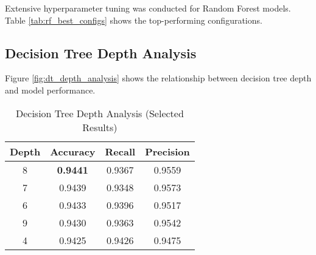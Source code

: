 \documentclass[12pt,a4paper]{article}
\begin{document}
Extensive hyperparameter tuning was conducted for Random Forest models. Table \ref{tab:rf_best_configs} shows the top-performing configurations.

\begin{table}[H]
\centering
\caption{Top Random Forest Configurations}
\label{tab:rf_best_configs}
\end{table}

\subsection{Decision Tree Depth Analysis}

Figure \ref{fig:dt_depth_analysis} shows the relationship between decision tree depth and model performance.

\begin{table}[H]
\centering
\caption{Decision Tree Depth Analysis (Selected Results)}
\label{tab:dt_depth}
\begin{tabular}{cccc}
\toprule
\textbf{Depth} & \textbf{Accuracy} & \textbf{Recall} & \textbf{Precision} \\
\midrule
8 & \textbf{0.9441} & 0.9367 & 0.9559 \\
7 & 0.9439 & 0.9348 & 0.9573 \\
6 & 0.9433 & 0.9396 & 0.9517 \\
9 & 0.9430 & 0.9363 & 0.9542 \\
4 & 0.9425 & 0.9426 & 0.9475 \\
\bottomrule
\end{tabular}
\end{table}
\end{document}
